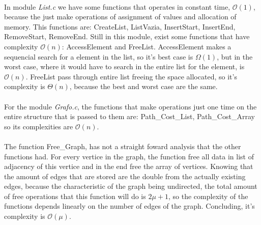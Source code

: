 \documentclass[titlepage]{article}
\begin{document}
        \paragraph{}
        In module \emph{List.c} we have some functions that operates in constant time, $\mathcal{O}(1)$, because the just make operations of assignment of values and allocation of memory. This functions are: CreateList, ListVazia, InsertStart, InsertEnd, RemoveStart, RemoveEnd. Still in this module, exist some functions that have complexity $\mathcal{O}(n)$: AccessElement and FreeList. AccessElement makes a sequencial search for a element in the list, so it's best case is $\Omega(1)$, but in the worst case, where it would have to search in the entire list for the element, is $\mathcal{O}(n)$. FreeList pass through entire list freeing the space allocated, so it's complexity is $\Theta(n)$, because the best and worst case are the same.
        \paragraph{}
        For the module \emph{Grafo.c}, the functions that make operations just one time on the entire structure that is passed to them are: Path\_Cost\_List, Path\_Cost\_Array so its complexities are $\mathcal{O}(n)$. 
        \paragraph{} 
        The function Free\_Graph, has not a straight foward analysis that the other functions had. For every vertice in the graph, the function free all data in list of adjacency of this vertice and in the end free the array of vertices. Knowing that the amount of edges that are stored are the double from the actually existing edges, because the characteristic of the graph being undirected, the total amount of free operations that this function will do is $2\mu+1$, so the complexity of the functions depends linearly on the number of edges of the graph. Concluding, it's complexity is $\mathcal{O}(\mu)$.
\end{document}
